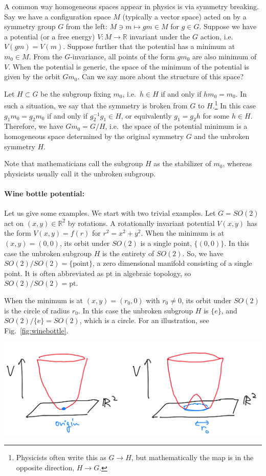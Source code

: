 \documentclass[12pt]{article}
\numberwithin{equation}{section}
\numberwithin{figure}{section}
\theoremstyle{remark}
\renewenvironment{figure}[1][]{
  \begin{originalfigure}[#1]
    \begin{mdframed}[linecolor=black!0,backgroundcolor=black!1]
}{
    \end{mdframed}
  \end{originalfigure}
}
\def\bR{\mathbb{R}}
\def\pt{\mathrm{pt}}
\begin{document}
A common way homogeneous spaces appear in physics is via symmetry breaking.
Say we have a configuration space $M$ (typically a vector space) acted on by a symmetry group $G$ from the left:
$M\ni m\mapsto gm\in M$ for $g\in G$.
Suppose we have a potential (or a free energy) $V:M\to \bR$ invariant under the $G$ action, i.e.~$V(gm)=V(m)$.
Suppose further that the potential has a minimum at $m_0 \in M$. 
From the $G$-invariance, all points of the form $gm_0$ are also minimum of $V$.
When the potential is generic, the space of the minimum of the potential is given by the orbit $Gm_0$.
Can we say more about the structure of this space?

Let $H\subset G$ be the subgroup fixing $m_0$, i.e.~$h\in H$ if and only if $hm_0=m_0$.
In such a situation, we say that the symmetry is broken from $G$ to $H$.\footnote{%
Physicists often write this as $G\to H$, 
but mathematically the map is in the opposite direction, $H\to G$.}
In this case $g_1 m_0 = g_2 m_0$ if and only if $g_2^{-1} g_1 \in H$, 
or equivalently $g_1 = g_2 h$ for some $h\in H$.
Therefore, we have $Gm_0=G/H$, i.e.~the space of the potential minimum is a homogeneous space
determined by the original symmetry $G$ and the unbroken symmetry $H$.

Note that mathematicians call the subgroup $H$ as the stabilizer of $m_0$,
whereas physicists usually call it the unbroken subgroup.

\paragraph{Wine bottle potential:}
Let us give some examples.
We start with two trivial examples.
Let $G=SO(2)$ act on $(x,y)\in \bR^2$ by rotations.
A rotationally invariant potential $V(x,y)$ has the form
$V(x,y)=f(r)$ for $r^2=x^2+y^2$.
When the minimum is at $(x,y)=(0,0)$, its orbit under $SO(2)$ is a single point, $\{(0,0)\}$.
In this case the unbroken subgroup $H$ is the entirety of $SO(2)$.
So, we have $SO(2)/SO(2)=\{\text{point}\}$, a zero dimensional manifold consisting of a single point.
It is often abbreviated as $\pt$ in algebraic topology, so $SO(2)/SO(2)=\pt$.

When the minimum is at $(x,y)=(r_0,0)$ with $r_0\neq 0$,
its orbit under $SO(2)$ is the circle of radius $r_0$.
In this case the unbroken subgroup $H$ is $\{e\}$,
and $SO(2)/\{e\}=SO(2)$, which is a circle.
For an illustration, see Fig.~\ref{fig:winebottle}.

\begin{figure}[h]
\centering
\includegraphics[width=.7\textwidth]{winebottle.png}
\caption{Two choices of $SO(2)$-invariant potential functions $V(x,y)$,
with minimum either at the origin or at the circle of radius $r_0$.}
\label{fig:winebottle}
\end{figure}
\end{document}
